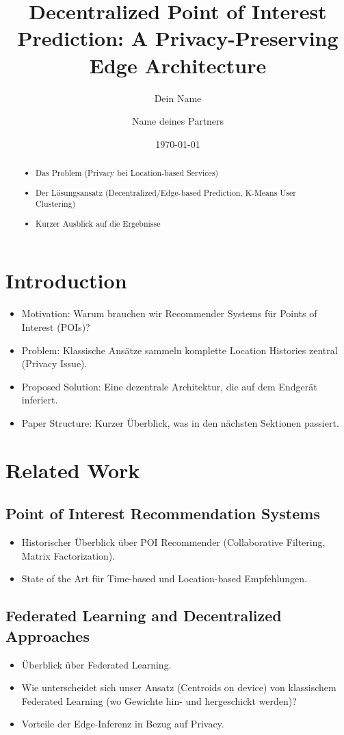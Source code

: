 \documentclass[11pt, a4paper]{article}
\title{Decentralized Point of Interest Prediction: A Privacy-Preserving Edge Architecture}
\author{Dein Name \and Name deines Partners}
\date{\today}
\begin{document}
\maketitle

\begin{abstract}
\begin{itemize}
    \item Das Problem (Privacy bei Location-based Services)
    \item Der Lösungsansatz (Decentralized/Edge-based Prediction, K-Means User Clustering)
    \item Kurzer Ausblick auf die Ergebnisse
\end{itemize}
\end{abstract}

\section{Introduction}
\begin{itemize}
    \item Motivation: Warum brauchen wir Recommender Systems für Points of Interest (POIs)?
    \item Problem: Klassische Ansätze sammeln komplette Location Histories zentral (Privacy Issue).
    \item Proposed Solution: Eine dezentrale Architektur, die auf dem Endgerät inferiert.
    \item Paper Structure: Kurzer Überblick, was in den nächsten Sektionen passiert.
\end{itemize}

\section{Related Work}
\subsection{Point of Interest Recommendation Systems}
\begin{itemize}
    \item Historischer Überblick über POI Recommender (Collaborative Filtering, Matrix Factorization).
    \item State of the Art für Time-based und Location-based Empfehlungen.
\end{itemize}

\subsection{Federated Learning and Decentralized Approaches}
\begin{itemize}
    \item Überblick über Federated Learning.
    \item Wie unterscheidet sich unser Ansatz (Centroids on device) von klassischem Federated Learning (wo Gewichte hin- und hergeschickt werden)?
    \item Vorteile der Edge-Inferenz in Bezug auf Privacy.
\end{itemize}
\end{document}
